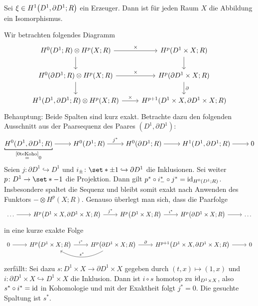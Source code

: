 \begin{lemma}[label=sec3:lem2,{name=[Isomorphismus für das Produkt mit $D^1$]}]
	Sei $\xi \in H^1 \enbrace*{D^1,\partial D^1;R}$ ein Erzeuger. Dann ist für jeden Raum $X$ die Abbildung 
	ein Isomorphismus.
\end{lemma}
\begin{beweis} Wir betrachten folgendes Diagramm
	\[
		\begin{tikzcd}
			H^0(D^1;R) \otimes H^p(X;R) \dar \rar["\times"] & H^p(D^1 \times X;R) \dar\\
			H^0(\partial D^1;R)  \otimes H^p(X;R) \rar["\times"] \dar & H^p(\partial D^1 \times X;R) \dar["\partial"] \\
			H^1(D^1,\partial D^1;R) \otimes H^p(X;R) \rar["\times"] & H^{p+1} (D^1 \times X,\partial D^1 \times X;R)
		\end{tikzcd}
	\]
	Behauptung: Beide Spalten sind kurz exakt.
	Betrachte dazu den folgenden Ausschnitt aus der Paarsequenz des Paares $(D^1, \partial D^1)$:
	\[
		\begin{tikzcd}[cramped]
			\Underbracket{H^0(D^1,\partial D^1;R)}{\StackText{\ref{0teKoho}}{=}0} \rar & H^0(D^1;R) \rar["j^*"] & H^0(\partial D^1;R) \rar & H^1(D^1,\partial D^1;R) \rar & 0
		\end{tikzcd}
	\]
	Seien $j \colon \partial D^1 \hookrightarrow D^1$ und $i_\pm \colon \set*{\pm 1} \hookrightarrow \partial D^1$ die Inklusionen. 
	Sei weiter $p \colon D^1 \to \set*{-1}$ die Projektion. 
	Dann gilt ${p^*} \circ {i_-^*} \circ {j^*} = \operatorname{id}_{H^0(D^1;R)}$. 
	Insbesondere spaltet die Sequenz und bleibt somit exakt nach Anwenden des Funktors ${-}\otimes H^p(X;R)$.
	Genauso überlegt man sich, dass die Paarfolge
	\[
		\begin{tikzcd}
			\ldots \rar & H^p \enbrace*{D^1\times X, \partial D^1\times X; R}\rar["j^*"] & H^p \enbrace*{D^1 \times X;R}\rar["i^*"] & H^p \enbrace*{\partial D^1 \times X;R}\rar & \ldots 
		\end{tikzcd}
	\]
	in eine kurze exakte Folge 
	\[
		\begin{tikzcd}
			0 \rar & H^p \enbrace*{D^1\times X;R} \rar["i^*"] & H^p \enbrace*{\partial D^1 \times X;R} \rar["\partial"] \lar[bend left,"s^*"'] & H^{p+1} \enbrace*{D^1 \times X,\partial D^1 \times X;R} \rar & 0
		\end{tikzcd}
	\]
	zerfällt: Sei dazu $s \colon D^1 \times X \to \partial D^1 \times X$ gegeben durch $(t,x) \mapsto (1,x)$ und $i \colon \partial D^1 \times X \hookrightarrow D^1 \times X$ die Inklusion.
	Dann ist $i \circ s$ homotop zu $\operatorname{id}_{D^1 \times X}$, also $s^* \circ i^*=\operatorname{id}$ in Kohomologie und mit der Exaktheit folgt $j^*=0$. Die gesuchte Spaltung ist $s^*$.
	

\end{beweis}
